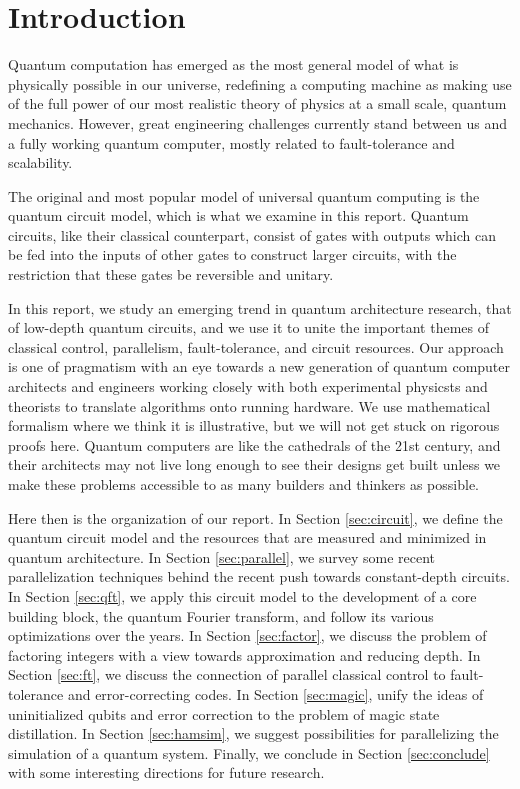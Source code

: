 \section{Introduction}
\label{sec:intro}

Quantum computation has emerged as the most general model of what is
physically possible in our universe, redefining a computing machine as
making use of the full power of our most realistic theory of physics
at a small scale, quantum mechanics. However, great engineering challenges
currently stand between us and a fully working quantum computer, mostly
related to fault-tolerance and scalability.

The original and most popular model of universal quantum computing is the
quantum circuit model, which is what we examine in this report.
Quantum circuits, like their classical counterpart, consist of gates
with outputs which can be fed into the inputs of other gates
to construct larger circuits, with the restriction that these gates be
reversible and unitary.

In this report, we study an emerging trend in quantum architecture
research, that of low-depth quantum circuits, and we use it to unite
the important themes of classical control, parallelism, fault-tolerance,
and circuit resources. Our approach is one of pragmatism with an
eye towards a new generation of quantum computer architects and engineers
working closely with both experimental physicsts and theorists to translate
algorithms onto running hardware. We use mathematical formalism where we
think it is illustrative, but we will not get stuck on rigorous proofs here.
Quantum computers are like the cathedrals of the 21st century, and their
architects may not live long enough to see their designs get built unless
we make these problems accessible to as many builders and thinkers as possible.

Here then is the organization of our report.
In Section \ref{sec:circuit}, we define the quantum circuit model and the
resources that are measured and minimized in quantum architecture.
In Section \ref{sec:parallel}, we survey some recent
parallelization techniques
behind the recent push towards constant-depth circuits.
In Section \ref{sec:qft}, we apply this circuit model to the development of
a core building block, the quantum Fourier transform, and follow its
various optimizations over the years. In Section \ref{sec:factor}, we
discuss the problem of factoring integers with a view towards approximation
and reducing depth.
In Section \ref{sec:ft}, we discuss the connection of parallel classical
control to fault-tolerance and error-correcting codes.
In Section \ref{sec:magic}, unify the ideas of uninitialized qubits and
error correction to the problem of
magic state distillation. In Section \ref{sec:hamsim}, we suggest
possibilities for parallelizing
the simulation of a quantum system.
Finally, we conclude in Section \ref{sec:conclude} with
some interesting directions for future research.